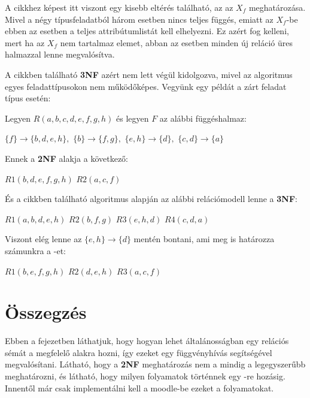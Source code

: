 A cikkhez képest itt viszont egy kisebb eltérés található, az az $X_f$ meghatározása. Mivel a négy típusfeladatból három esetben nincs teljes függés, emiatt az $X_f$-be ebben az esetben a teljes attribútumlistát kell elhelyezni. Ez azért fog kelleni, mert ha az $X_f$ nem tartalmaz elemet, abban az esetben minden új reláció üres halmazzal lenne megvalósítva. \par

A cikkben található \textbf{3NF} azért nem lett végül kidolgozva, mivel az algoritmus egyes feladattípusokon nem működőképes. Vegyünk egy példát a zárt feladat típus esetén:

\begin{pld}
Legyen $R(a,b,c,d,e,f,g,h)$ és legyen $F$ az alábbi függéshalmaz:
\begin{center}
    $\{f\} \longrightarrow \{b,d,e,h\},$\break
    $\{b\} \longrightarrow \{f,g\},$\break
    $\{e,h\} \longrightarrow \{d\},$\break
    $\{c,d\} \longrightarrow \{a\}$
\end{center}
Ennek a \textbf{2NF} alakja a következő:
\begin{center}
    $R1(b,d,e,f,g,h)$ \break
    $R2(a,c,f)$
\end{center}
És a cikkben található algoritmus alapján az alábbi relációmodell lenne a \textbf{3NF}:
\begin{center}
    $R1(a,b,d,e,h)$ \break
    $R2(b,f,g)$ \break
    $R3(e,h,d)$ \break
    $R4(c,d,a)$
\end{center}
Viszont elég lenne az $\{e,h\} \longrightarrow \{d\}$ mentén bontani, ami meg is határozza számunkra a \nfh-et:
\begin{center}
    $R1(b,e,f,g,h)$ \break
    $R2(d,e,h)$
    $R3(a,c,f)$
\end{center}
\end{pld}

\section{Összegzés}

Ebben a fejezetben láthatjuk, hogy hogyan lehet általánosságban egy relációs sémát a megfelelő alakra hozni, így ezeket egy függvényhívás segítségével megvalósítani. Látható, hogy a \textbf{2NF} meghatározás nem a mindig a legegyszerűbb meghatározni, és látható, hogy milyen folyamatok történnek egy \nfk-re hozásig. Innentől már csak implementálni kell a moodle-be ezeket a folyamatokat. 